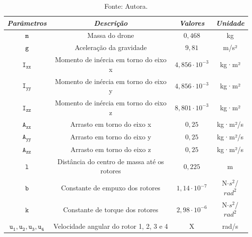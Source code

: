 \begin{center}
    \begin{longtable}{|c|c|c|c|} %
        \caption{Parâmetros do sistema} \vspace{-0.4cm}
        \label{tab:params}
        \hline
        \emph{Parâmetros} & \emph{Descrição} & \emph{Valores} & \emph{Unidade} \\
        \hline
        \endfirsthead
        \endhead
        \endfoot
        \caption*{\footnotesize{Fonte: Autora.}} \vspace{-0.8cm}
        \endlastfoot

        $\mathtt{m}$ & Massa do drone & $0,468$ &kg \\ \hline
        $\mathtt{g}$ & Aceleração da gravidade & $9,81$ & m/s² \\ \hline
        $\mathtt{I_{xx}}$ & Momento de inércia em torno do eixo x & $4,856 \cdot 10^{-3}$ & kg·m² \\ \hline
        $\mathtt{I_{yy}}$ & Momento de inércia em torno do eixo y & $4,856 \cdot 10^{-3}$ & kg·m² \\ \hline
        $\mathtt{I_{zz}}$ & Momento de inércia em torno do eixo z & $8,801 \cdot 10^{-3}$ & kg·m² \\ \hline
        $\mathtt{A_{xx}}$ & Arrasto em torno do eixo x & $0,25$ & kg·m²/s \\ \hline
        $\mathtt{A_{yy}}$ & Arrasto em torno do eixo y & $0,25$ & kg·m²/s \\ \hline
        $\mathtt{A_{zz}}$ & Arrasto em torno do eixo z & $0,25$ & kg·m²/s \\ \hline
        $\mathtt{l}$ & Distância do centro de massa até os rotores & $0,225$ & m \\ \hline
        $\mathtt{b}$ & Constante de empuxo dos rotores & $1,14 \cdot 10^{-7}$ & N$\cdot s^{2}$/$rad^{2}$ \\ \hline
        $\mathtt{k}$ & Constante de torque dos rotores & $2,98 \cdot 10^{-6}$ & N$\cdot s^{2}$/$rad^{2}$ \\ \hline
        $\mathtt{u_1, u_2, u_3, u_4}$ & Velocidade angular do rotor 1, 2, 3 e 4 & X & rad/s \\ \hline
    \end{longtable}
\end{center}

\vspace{-1.5cm}


